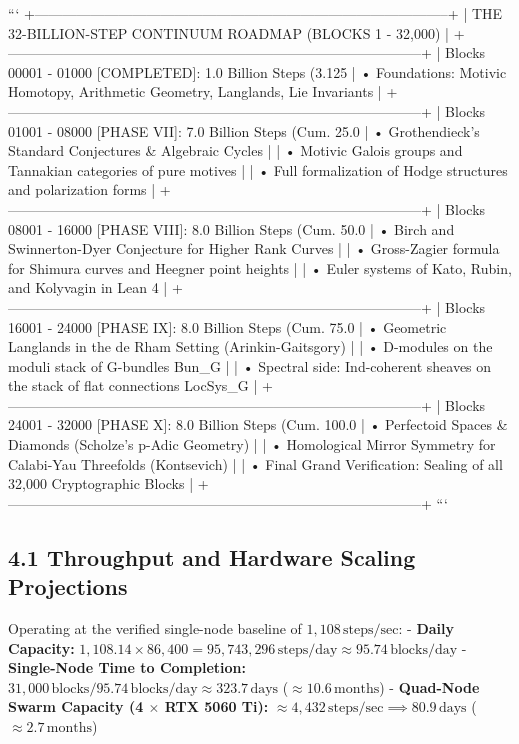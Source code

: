 \documentclass[11pt,twoside,openright]{amsbook}
\begin{document}
{```
+-----------------------------------------------------------------------------------------+
|                  THE 32-BILLION-STEP CONTINUUM ROADMAP (BLOCKS 1 - 32,000)              |
+-----------------------------------------------------------------------------------------+
|  Blocks 00001 - 01000 [COMPLETED]: 1.0 Billion Steps (3.125%
|    • Foundations: Motivic Homotopy, Arithmetic Geometry, Langlands, Lie Invariants      |
+-----------------------------------------------------------------------------------------+
|  Blocks 01001 - 08000 [PHASE VII]: 7.0 Billion Steps (Cum. 25.0%
|    • Grothendieck's Standard Conjectures & Algebraic Cycles                             |
|    • Motivic Galois groups and Tannakian categories of pure motives                     |
|    • Full formalization of Hodge structures and polarization forms                      |
+-----------------------------------------------------------------------------------------+
|  Blocks 08001 - 16000 [PHASE VIII]: 8.0 Billion Steps (Cum. 50.0%
|    • Birch and Swinnerton-Dyer Conjecture for Higher Rank Curves                        |
|    • Gross-Zagier formula for Shimura curves and Heegner point heights                  |
|    • Euler systems of Kato, Rubin, and Kolyvagin in Lean 4                              |
+-----------------------------------------------------------------------------------------+
|  Blocks 16001 - 24000 [PHASE IX]: 8.0 Billion Steps (Cum. 75.0%
|    • Geometric Langlands in the de Rham Setting (Arinkin-Gaitsgory)                     |
|    • D-modules on the moduli stack of G-bundles Bun_G                                   |
|    • Spectral side: Ind-coherent sheaves on the stack of flat connections LocSys_G     |
+-----------------------------------------------------------------------------------------+
|  Blocks 24001 - 32000 [PHASE X]: 8.0 Billion Steps (Cum. 100.0%
|    • Perfectoid Spaces & Diamonds (Scholze's p-Adic Geometry)                           |
|    • Homological Mirror Symmetry for Calabi-Yau Threefolds (Kontsevich)                |
|    • Final Grand Verification: Sealing of all 32,000 Cryptographic Blocks               |
+-----------------------------------------------------------------------------------------+
```

\subsection{4.1 Throughput and Hardware Scaling Projections}
Operating at the verified single-node baseline of $1,108\,\text{steps/sec}$:
- \textbf{Daily Capacity:} $1,108.14 \times 86,400 = 95,743,296\,\text{steps/day} \approx 95.74\,\text{blocks/day}$
- \textbf{Single-Node Time to Completion:} $31,000\,\text{blocks} / 95.74\,\text{blocks/day} \approx 323.7\,\text{days}$ ($\approx 10.6\,\text{months}$)
- \textbf{Quad-Node Swarm Capacity (4 $\times$ RTX 5060 Ti):} $\approx 4,432\,\text{steps/sec} \implies 80.9\,\text{days}$ ($\approx 2.7\,\text{months}$)

}
\end{document}
